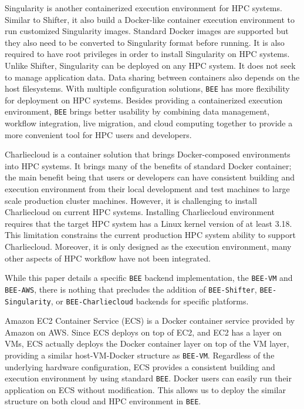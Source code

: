 Singularity is another containerized execution environment for HPC systems. Similar to Shifter, it also build a Docker-like container execution environment to run customized Singularity images. Standard Docker images are supported but they also need to be converted to Singularity format before running. It is also required to have root privileges in order to install Singularity on HPC systems. Unlike Shifter, Singularity can be deployed on any HPC system. It does not seek to manage application data. Data sharing between containers also depends on the host filesystems. With multiple configuration solutions, \texttt{BEE} has more flexibility for deployment on HPC systems. Besides providing a containerized execution environment, \texttt{BEE} brings better usability by combining data management, workflow integration, live migration, and cloud computing together to provide a more convenient tool for HPC users and developers.

Charliecloud is a container solution that brings Docker-composed environments into HPC systems. It brings many of the benefits of standard Docker container; the main benefit  being that users or developers can have consistent building and execution environment from their local development and test machines to large scale production cluster machines. However, it is challenging to install Charliecloud on current HPC systems. Installing Charliecloud environment requires that the target HPC system has a Linux kernel version of at least 3.18.  This limitation constrains the current production HPC system ability to support Charliecloud. Moreover, it is only designed as the execution environment, many other aspects of HPC workflow have not been integrated.

While this paper details a specific \texttt{BEE} backend implementation, the \texttt{BEE-VM} and
\texttt{BEE-AWS}, there is nothing that precludes the addition of \texttt{BEE-Shifter}, \texttt{BEE-Singularity}, or \texttt{BEE-Charliecloud} backends for specific platforms.

Amazon EC2 Container Service (ECS) \cite{awscontainer} is a Docker container service provided by Amazon on AWS. Since ECS deploys on top of EC2, and EC2 has a layer on VMs, ECS actually deploys the Docker container layer on top of the VM layer, providing a similar host-VM-Docker structure as \texttt{BEE-VM}. Regardless of the underlying hardware configuration, ECS provides a consistent building and execution environment by using standard \texttt{BEE}. Docker users can easily run their application on ECS without modification. This allows us to deploy the similar structure on both cloud and HPC environment in \texttt{BEE}. 
  

